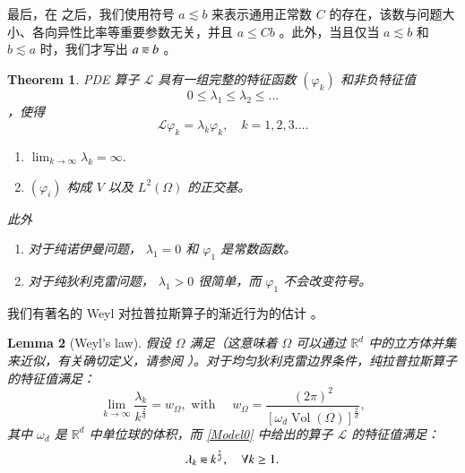 \documentclass[12pt]{acta_2011xz}
\newcommand{\eqqsim}{\mathbin{\rotatebox[origin=c]{180}{\ensuremath{\cong}}}}
\newtheorem{theorem}{Theorem}[section]
\newtheorem{lemma}[theorem]{Lemma}
\begin{document}
最后，在    \cite{1992XuJ-aa}    之后，我们使用符号
   $a\lesssim b$    来表示通用正常数    $C$    的存在，该数与问题大小、各向异性比率等重要参数无关，并且    $a\le Cb$    。此外，当且仅当    $a\lesssim b$    和
   $b\lesssim a$    时，我们才写出    $a\eqqsim b$    。  

   \begin{theorem}PDE 算子    ${\mathcal L}$    具有一组完整的特征函数
   $(\varphi_k)$    和非负特征值 
   $$
0\le\lambda_1\le\lambda_2\le \ldots 
$$    ，使得 
   $$
{\mathcal L}\varphi_k=\lambda_k\varphi_k, \quad k=1, 2, 3\ldots. 
$$    
   \begin{enumerate}

   \item            $\lim_{k\to\infty}\lambda_k=\infty.$            \item            $(\varphi_i)$          构成          $V$          以及          $L^2(\Omega)$          的正交基。  \end{enumerate}    此外
   \begin{enumerate}

   \item   对于纯诺伊曼问题，         $\lambda_1=0$          和          $\varphi_1$          是常数函数。   \item   对于纯狄利克雷问题，         $\lambda_1>0$          很简单，而          $\varphi_1$          不会改变符号。  \end{enumerate}     \end{theorem}     

我们有著名的 Weyl 对拉普拉斯算子的渐近行为的估计
   \cite{weyl1911asymptotische,wbyii1912asymptotische,reed1978iv}    。
   \begin{lemma}[Weyl's law]   \label{lem:Weyl}    假设    $\Omega$    满足（这意味着    $\Omega$    可以通过    $\mathbb{R}^d$    中的立方体并集来近似，有关确切定义，请参阅    \cite[page
  271]{reed1978iv}   ）。对于均匀狄利克雷边界条件，纯拉普拉斯算子的特征值满足：
   \begin{equation}\label{Weyl0}
    \lim_{k\rightarrow\infty}\frac{\lambda_k}{k^{\frac{2}{d}}}=w_{\Omega},
    \mbox{ with }
    \quad w_{\Omega}=\frac{(2\pi)^2}{[\omega_d \operatorname{Vol}(\Omega)]^{\frac{2}{d}}},
\end{equation}    其中    $\omega_d$    是    $\mathbb{R}^d$    中单位球的体积，而    \eqref{Model0}    中给出的算子    $\mathcal L$    的特征值满足：
   \begin{equation}\label{Weyl}
    \lambda_k\eqqsim k^{\frac{2}{d}}, \quad \forall k\ge 1.
\end{equation}     \end{lemma}     
\end{document}
